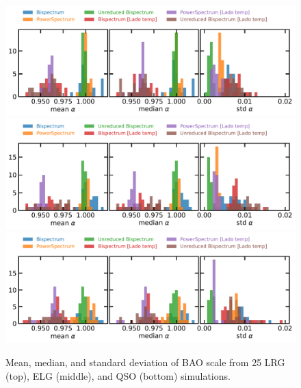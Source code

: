 \begin{figure}
    \centering
    \includegraphics[width=\textwidth]{figures/constraints_LRGz0.pdf}
    \includegraphics[width=\textwidth]{figures/constraints_ELGz1.pdf}
    \includegraphics[width=\textwidth]{figures/constraints_QSOz2.pdf}    
    \caption{Mean, median, and standard deviation of BAO scale from 25 LRG (top), ELG (middle), and QSO (bottom) simulations.}
    \label{fig:constraints}
\end{figure}


